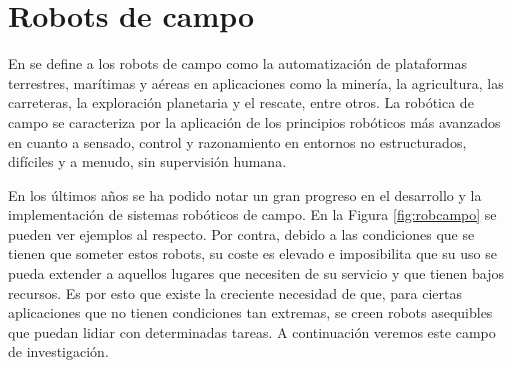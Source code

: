 
\section{Robots de campo}
\label{sec:robotcampo}

En \cite{thorpe2003field} se define a los robots de campo como la automatización de plataformas terrestres, marítimas y aéreas en aplicaciones como la minería, la agricultura, las carreteras, la exploración planetaria y el rescate, entre otros. La robótica de campo se caracteriza por la aplicación de los principios robóticos más avanzados en cuanto a sensado, control y razonamiento en entornos no estructurados, difíciles y a menudo, sin supervisión humana. 


En los últimos años se ha podido notar un gran progreso en el desarrollo y la implementación de sistemas robóticos de campo. En la Figura \ref{fig:robcampo} se pueden ver ejemplos al respecto. Por contra, debido a las condiciones que se tienen que someter estos robots, su coste es elevado e imposibilita que su uso se pueda extender a aquellos lugares que necesiten de su servicio y que tienen bajos recursos. Es por esto que existe la creciente necesidad de que, para ciertas aplicaciones que no tienen condiciones tan extremas, se creen robots asequibles que puedan lidiar con determinadas tareas. A continuación veremos este campo de investigación. 


